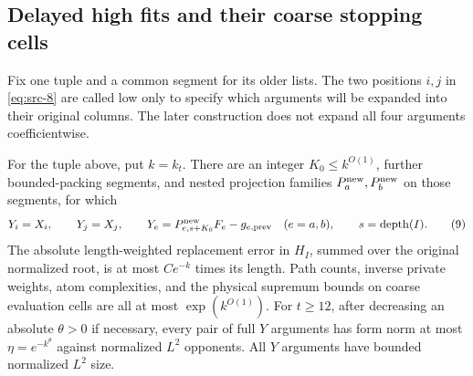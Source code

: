\subsection{Delayed high fits and their coarse stopping cells}

Fix one tuple and a common segment for its older lists.  The two
positions $i,j$ in \eqref{eq:src-8} are called low only to specify
which arguments will be expanded into their original columns.
The later construction does not expand all four arguments
coefficientwise.

\begin{proposition}
\label{prop:high-truncation}
For the tuple above, put $k=k_t$.  There are an integer
$K_0\le k^{O(1)}$, further bounded-packing segments, and nested
projection families $P^{\rm new}_a,P^{\rm new}_b$ on those
segments, for which
\begin{equation*}
 Y_i=X_i,\qquad Y_j=X_j,\qquad
 Y_e=P^{\rm new}_{e,s+K_0}F_e-g_{e,\mathrm{prev}}\quad(e=a,b),
 \qquad s=\operatorname{depth}(I).
\tag{9}\label{eq:src-9}
\end{equation*}
The absolute length-weighted replacement error in $H_I$, summed
over the original normalized root, is at most $Ce^{-k}$ times
its length.  Path counts, inverse private weights, atom
complexities, and the physical supremum bounds on coarse
evaluation cells are all at most $\exp(k^{O(1)})$.
For $t\ge12$, after decreasing an absolute $\theta>0$ if necessary,
every pair of full $Y$ arguments has form norm at most
$\eta=e^{-k^\theta}$ against normalized $L^2$ opponents.
All $Y$ arguments have bounded normalized $L^2$ size.
\end{proposition}

